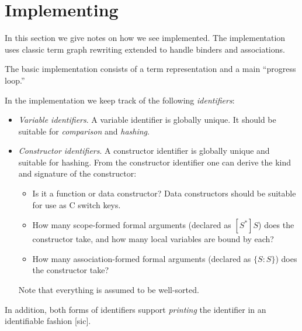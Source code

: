 \documentclass[letterpaper,11pt]{article}
\begin{document}



\section{Implementing \hax}
\label{sec:implement}

In this section we give notes on how we see \hax implemented. The implementation uses classic term
graph rewriting extended to handle binders and associations.

The basic \hax implementation consists of a term representation and a main ``progress loop.''

\begin{definition}[identifiers]
  In the implementation we keep track of the following \emph{identifiers}:
  \begin{itemize}

  \item \emph{Variable identifiers}. A variable identifier is globally unique. It should be suitable
    for \emph{comparison} and \emph{hashing}.

  \item \emph{Constructor identifiers}. A constructor identifier is globally unique and suitable for
    hashing. From the constructor identifier one can derive the kind and signature of the
    constructor:
    \begin{itemize}
    \item Is it a function or data constructor? Data constructors should be suitable for use as C
      switch keys.
    \item How many scope-formed formal arguments (declared as $[S^*]S$) does the constructor take,
      and how many local variables are bound by each?
    \item How many association-formed formal arguments (declared as $\{S:S\}$) does the constructor
      take?
    \end{itemize}
    Note that everything is assumed to be well-sorted.

  \end{itemize}
  In addition, both forms of identifiers support \emph{printing} the identifier in an identifiable
  fashion [sic].
\end{definition}
\end{document}
